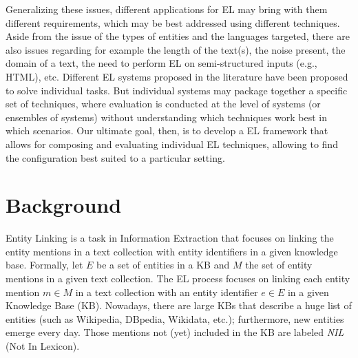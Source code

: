 \documentclass[sigconf]{acmart}
\begin{document}
Generalizing these issues, different applications for EL may bring with them different requirements, which may be best addressed using different techniques. Aside from the issue of the types of entities and the languages targeted, there are also issues regarding for example the length of the text(s), the noise present, the domain of a text, the need to perform EL on semi-structured inputs (e.g., HTML), etc. Different EL systems proposed in the literature have been proposed to solve individual tasks. But individual systems may package together a specific set of techniques, where evaluation is conducted at the level of systems (or ensembles of systems) without understanding which techniques work best in which scenarios. Our ultimate goal, then, is to develop a EL framework that allows for composing and evaluating individual EL techniques, allowing to find the configuration best suited to a particular setting.



\section{Background}
Entity Linking is a task in Information Extraction that focuses on linking the entity mentions in a text collection with entity identifiers in a given knowledge base. Formally, let $E$ be a set of entities in a KB and $M$ the set of entity mentions in a given text collection. The EL process focuses on linking each entity mention $m\in{}M$ in a text collection with an entity identifier $e\in{}E$ in a given Knowledge Base (KB). Nowadays, there are large KBs that describe a huge list of entities (such as Wikipedia, DBpedia, Wikidata, etc.); furthermore, new entities emerge every day. Those mentions not (yet) included in the KB are labeled \textit{NIL} (Not In Lexicon).
\end{document}
